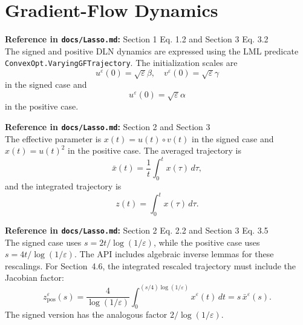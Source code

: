 \section{Gradient-Flow Dynamics}

\begin{definition}\label{def:lassoGradientFlows}
  \textbf{Reference in \texttt{docs/Lasso.md}:} Section 1 Eq. 1.2 and Section 3 Eq. 3.2\\
The signed and positive DLN dynamics are expressed using the LML predicate
\texttt{ConvexOpt.VaryingGFTrajectory}.
The initialization scales are
\[
  u^\varepsilon(0)=\sqrt{\varepsilon}\beta,\quad
  v^\varepsilon(0)=\sqrt{\varepsilon}\gamma
\]
in the signed case and
\[
  u^\varepsilon(0)=\sqrt{\varepsilon}\alpha
\]
in the positive case.
\end{definition}

\begin{definition}\label{def:lassoTrajectories}
  \textbf{Reference in \texttt{docs/Lasso.md}:} Section 2 and Section 3\\
The effective parameter is $x(t)=u(t)\circ v(t)$ in the signed case and
$x(t)=u(t)^2$ in the positive case.
The averaged trajectory is
\[
  \bar x(t)=\frac1t\int_0^t x(\tau)\,d\tau,
\]
and the integrated trajectory is
\[
  z(t)=\int_0^t x(\tau)\,d\tau.
\]
\end{definition}

\begin{definition}\label{def:lassoRescaledTime}
  \textbf{Reference in \texttt{docs/Lasso.md}:} Section 2 Eq. 2.2 and Section 3 Eq. 3.5\\
The signed case uses $s = 2t/\log(1/\varepsilon)$, while the positive case uses
$s = 4t/\log(1/\varepsilon)$.
The API includes algebraic inverse lemmas for these rescalings.
For Section~4.6, the integrated rescaled trajectory must include the Jacobian
factor:
\[
  z^\varepsilon_{\mathrm{pos}}(s)
  =
  \frac{4}{\log(1/\varepsilon)}
  \int_0^{(s/4)\log(1/\varepsilon)} x^\varepsilon(t)\,dt
  =
  s\,\bar x^\varepsilon(s).
\]
The signed version has the analogous factor $2/\log(1/\varepsilon)$.
\end{definition}

